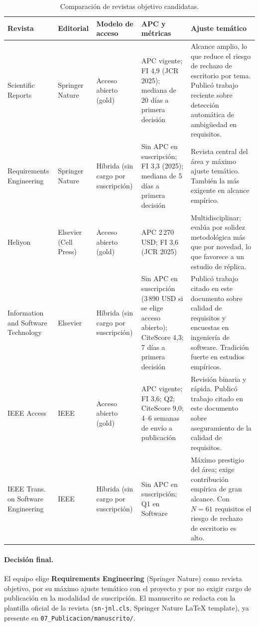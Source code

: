 \documentclass[journal,onecolumn]{IEEEtran}
\begin{document}
	\begin{table}[H]
		\centering
		\caption{Comparación de revistas objetivo candidatas.}
		\label{tab:revistas}
		\small
		\begin{tabularx}{\textwidth}{@{}p{3.0cm} p{1.7cm} p{1.5cm} p{2.4cm} X@{}}
			\toprule
			\textbf{Revista} & \textbf{Editorial} & \textbf{Modelo de acceso} & \textbf{APC y métricas} & \textbf{Ajuste temático} \\
			\midrule
			Scientific Reports & Springer Nature & Acceso abierto (gold) & APC vigente; FI 4,9 (JCR 2025); mediana de 20 días a primera decisión & Alcance amplio, lo que reduce el riesgo de rechazo de escritorio por tema. Publicó trabajo reciente sobre detección automática de ambigüedad en requisitos. \\
			\addlinespace
			Requirements Engineering & Springer Nature & Híbrida (sin cargo por suscripción) & Sin APC en suscripción; FI 3,3 (2025); mediana de 5 días a primera decisión & Revista central del área y máximo ajuste temático. También la más exigente en alcance empírico. \\
			\addlinespace
			Heliyon & Elsevier (Cell Press) & Acceso abierto (gold) & APC 2\,270 USD; FI 3,6 (JCR 2025) & Multidisciplinar; evalúa por solidez metodológica más que por novedad, lo que favorece a un estudio de réplica. \\
			\addlinespace
			Information and Software Technology & Elsevier & Híbrida (sin cargo por suscripción) & Sin APC en suscripción (3\,890 USD si se elige acceso abierto); CiteScore 4,3; 7 días a primera decisión & Publicó trabajo citado en este documento sobre calidad de requisitos y encuestas en ingeniería de software. Tradición fuerte en estudios empíricos. \\
			\addlinespace
			IEEE Access & IEEE & Acceso abierto (gold) & APC vigente; FI 3,6; Q2; CiteScore 9,0; 4--6 semanas de envío a publicación & Revisión binaria y rápida. Publicó trabajo citado en este documento sobre aseguramiento de la calidad de requisitos. \\
			\addlinespace
			IEEE Trans. on Software Engineering & IEEE & Híbrida (sin cargo por suscripción) & Sin APC en suscripción; Q1 en Software & Máximo prestigio del área; exige contribución empírica de gran alcance. Con $N = 61$ requisitos el riesgo de rechazo de escritorio es alto. \\
			\bottomrule
		\end{tabularx}
	\end{table}
	

	\paragraph{Decisión final.}
	El equipo elige \textbf{Requirements Engineering} (Springer Nature) como
	revista objetivo, por su máximo ajuste temático con el proyecto y por no
	exigir cargo de publicación en la modalidad de suscripción. El
	manuscrito se redacta con la plantilla oficial de la revista
	(\texttt{sn-jnl.cls}, Springer Nature LaTeX template), ya presente en
	\texttt{07\_Publicacion/manuscrito/}.
\end{document}
